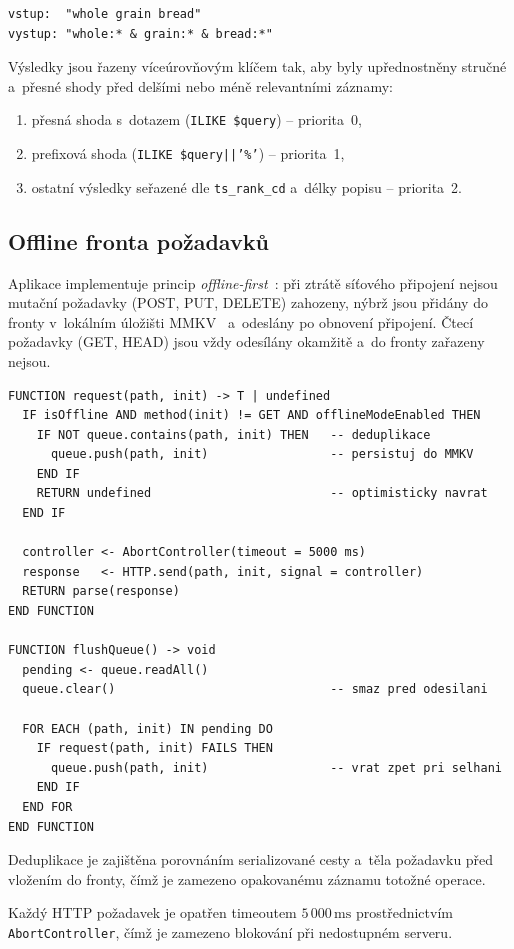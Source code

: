 \begin{lstlisting}[caption={Transformace vstupního řetězce na tsquery},
  label={lst:query-transform}]
vstup:  "whole grain bread"
vystup: "whole:* & grain:* & bread:*"
\end{lstlisting}

Výsledky jsou řazeny víceúrovňovým klíčem tak, aby byly upřednostněny
stručné a~přesné shody před delšími nebo méně relevantními záznamy:

\begin{enumerate}
  \item přesná shoda s~dotazem (\texttt{ILIKE \$query}) -- priorita~0,
  \item prefixová shoda (\texttt{ILIKE \$query||'\%'}) -- priorita~1,
  \item ostatní výsledky seřazené dle \texttt{ts\_rank\_cd}
        a~délky popisu -- priorita~2.
\end{enumerate}

\subsection{Offline fronta požadavků}
\label{sec:offline-fronta}

Aplikace implementuje princip \textit{offline-first}~\cite{offlinefirst2015}:
při ztrátě síťového připojení nejsou mutační požadavky (POST, PUT,
DELETE) zahozeny, nýbrž jsou přidány do fronty v~lokálním
úložišti MMKV~\cite{mmkv2024} a~odeslány po obnovení připojení.
Čtecí požadavky (GET, HEAD) jsou vždy odesílány okamžitě a~do fronty
zařazeny nejsou.

\begin{lstlisting}[caption={Pseudokód zpracování HTTP požadavku s offline frontou},
  label={lst:offline-queue}]
FUNCTION request(path, init) -> T | undefined
  IF isOffline AND method(init) != GET AND offlineModeEnabled THEN
    IF NOT queue.contains(path, init) THEN   -- deduplikace
      queue.push(path, init)                 -- persistuj do MMKV
    END IF
    RETURN undefined                         -- optimisticky navrat
  END IF

  controller <- AbortController(timeout = 5000 ms)
  response   <- HTTP.send(path, init, signal = controller)
  RETURN parse(response)
END FUNCTION

FUNCTION flushQueue() -> void
  pending <- queue.readAll()
  queue.clear()                              -- smaz pred odesilani

  FOR EACH (path, init) IN pending DO
    IF request(path, init) FAILS THEN
      queue.push(path, init)                 -- vrat zpet pri selhani
    END IF
  END FOR
END FUNCTION
\end{lstlisting}

Deduplikace je zajištěna porovnáním serializované cesty a~těla požadavku
před vložením do fronty, čímž je zamezeno opakovanému záznamu totožné
operace.

Každý HTTP požadavek je opatřen timeoutem $5\,000\,\text{ms}$
prostřednictvím \texttt{Abort}\allowbreak\texttt{Controller}, čímž je zamezeno blokování
při nedostupném serveru.
